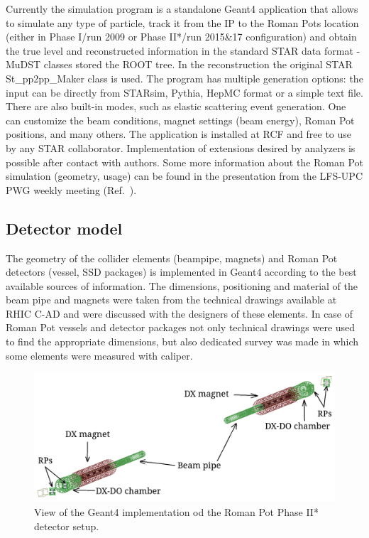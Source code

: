 Currently the simulation program is a standalone Geant4 application that allows to simulate any type of particle, track it from the IP to the Roman Pots location (either in Phase I/run 2009 or Phase II*/run 2015\&17 configuration) and obtain the true level and reconstructed information in the standard STAR data format - MuDST classes stored the ROOT tree. In the reconstruction the original STAR St\_pp2pp\_Maker class is used. The program has multiple generation options: the input can be directly from STARsim, Pythia, HepMC format or a simple text file. There are also built-in modes, such as elastic scattering event generation. One can customize the beam conditions, magnet settings (beam energy), Roman Pot positions, and many others. The application is installed at RCF and free to use by any STAR collaborator. Implementation of extensions desired by analyzers is possible after contact with authors. Some more information about the Roman Pot simulation (geometry, usage) can be found in the presentation from the LFS-UPC PWG weekly meeting (Ref.~\cite{Geant4Presentation}).

\subsection{Detector model}

The geometry of the collider elements (beampipe, magnets) and Roman Pot detectors (vessel, SSD packages) is  implemented in Geant4 according to the best available sources of information. The dimensions, positioning and material of the beam pipe and magnets were taken from the technical drawings available at RHIC C-AD and were discussed with the designers of these elements. In case of Roman Pot vessels and detector packages not only technical drawings were used to find the appropriate dimensions, but also dedicated survey was made in which some elements were measured with caliper.

\begin{figure}[h]%
	\vspace{-10pt}\centering\includegraphics[width=\linewidth]{graphics/rpSim/geant4plot.png}%
	\caption{View of the Geant4 implementation od the Roman Pot Phase II* detector setup.}\label{fig:geant4plot}%
\end{figure}%

